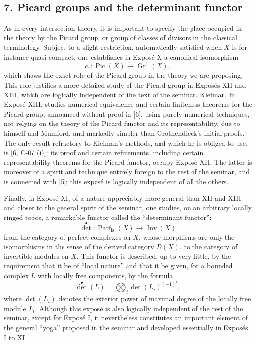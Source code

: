 \documentclass[11pt]{article}
\newcommand{\Gr}{\operatorname{Gr}}
\newcommand{\Parf}{\operatorname{Parf}}
\providecommand{\Inv}{\operatorname{Inv}}
\providecommand{\Pic}{\operatorname{Pic}}
\providecommand{\Gr}{\operatorname{Gr}}
\providecommand{\Gr}{\operatorname{G}}
\begin{document}
\subsection*{7. Picard groups and the determinant functor}
As in every intersection theory, it is important to specify the place occupied in the theory by the Picard group, or group of classes of divisors in the classical terminology. Subject to a slight restriction, automatically satisfied when $X$ is for instance quasi-compact, one establishes in Expos\'e X a canonical isomorphism
\begin{equation}\tag{7.1}
c_1:\Pic(X)\xrightarrow{\sim}\Gr^1(X),
\end{equation}
which shows the exact role of the Picard group in the theory we are proposing. This role justifies a more detailed study of the Picard group in Expos\'es XII and XIII, which are logically independent of the text of the seminar. Kleiman, in Expos\'e XIII, studies numerical equivalence and certain finiteness theorems for the Picard group, announced without proof in [6], using purely numerical techniques, not relying on the theory of the Picard functor and its representability, due to himself and Mumford, and markedly simpler than Grothendieck's initial proofs. The only result refractory to Kleiman's methods, and which he is obliged to use, is [6, C-07 (i)]; its proof and certain refinements, including certain representability theorems for the Picard functor, occupy Expos\'e XII. The latter is moreover of a spirit and technique entirely foreign to the rest of the seminar, and is connected with [5]; this expos\'e is logically independent of all the others.

Finally, in Expos\'e XI, of a nature appreciably more general than XII and XIII and closer to the general spirit of the seminar, one studies, on an arbitrary locally ringed topos, a remarkable functor called the ``determinant functor'':
\begin{equation}\tag{7.2}
\det^\bullet:\Parf_{\mathrm{is}}(X)\longrightarrow \Inv(X)
\end{equation}
from the category of perfect complexes on $X$, whose morphisms are only the isomorphisms in the sense of the derived category $D(X)$, to the category of invertible modules on $X$. This functor is described, up to very little, by the requirement that it be of ``local nature'' and that it be given, for a bounded complex $L$ with locally free components, by the formula
\begin{equation}\tag{7.3}
\det^\bullet(L)=\bigotimes_i \det(L_i)^{(-1)^i},
\end{equation}
where $\det(L_i)$ denotes the exterior power of maximal degree of the locally free module $L_i$. Although this expos\'e is also logically independent of the rest of the seminar, except for Expos\'e I, it nevertheless constitutes an important element of the general ``yoga'' proposed in the seminar and developed essentially in Expos\'es I to XI.
\end{document}
